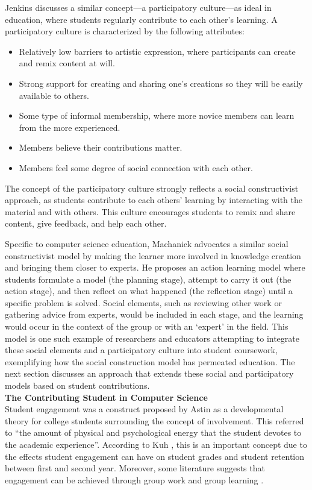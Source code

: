 Jenkins \cite{jenkins2009confronting} discusses a similar concept---a participatory culture---as ideal in education, where students regularly contribute to each other's learning. A participatory culture is characterized by the following attributes:

\begin{itemize}
\item Relatively low barriers to artistic expression, where participants can create and remix content at will.
\item Strong support for creating and sharing one’s creations so they will be easily available to others.
\item Some type of informal membership, where more novice members can learn from the more experienced.
\item Members believe their contributions matter.
\item Members feel some degree of social connection with each other.
\end{itemize}

The concept of the participatory culture strongly reflects a social constructivist approach, as students contribute to each others' learning by interacting with the material and with others. This culture encourages students to remix and share content, give feedback, and help each other.

Specific to computer science education, Machanick \cite{machanick2007social} advocates a similar social constructivist model by making the learner more involved in knowledge creation and bringing them closer to experts. He proposes an action learning model where students formulate a model (the planning stage), attempt to carry it out (the action stage), and then reflect on what happened (the reflection stage) until a specific problem is solved. Social elements, such as reviewing other work or gathering advice from experts, would be included in each stage, and the learning would occur in the context of the group or with an ‘expert’ in the field. This model is one such example of researchers and educators attempting to integrate these social elements and a participatory culture into student coursework, exemplifying how the social construction model has permeated education. The next section discusses an approach that extends these social and participatory models based on student contributions. \\

\textbf{The Contributing Student in Computer Science} \\
Student engagement was a construct proposed by Astin \cite{astin1984student} as a developmental theory for college students surrounding the concept of involvement. This referred to ``the amount of physical and psychological energy that the student devotes to the academic experience''. According to Kuh \cite{kuh2001assessing}, this is an important concept due to the effects student engagement can have on student grades and student retention between first and second year. Moreover, some literature suggests that engagement can be achieved through group work and group learning \cite{bower2007groupwork}.


